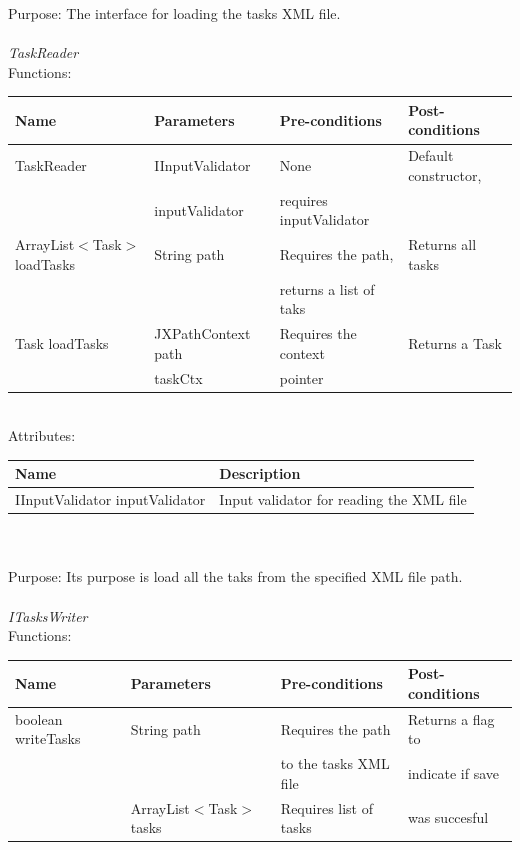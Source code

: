 Purpose: The interface for loading the tasks XML file.
\\
\\
\emph{TaskReader}\\
Functions:\\
\begin{tabular}{| l | l | l | l |}
\hline
Name & Parameters & Pre-conditions & Post-conditions\\
\hline
		TaskReader				& IInputValidator 	& None				& Default constructor, \\
							& inputValidator	&  requires inputValidator	& \\
		ArrayList$<$Task$>$loadTasks 	& String path       	& Requires the path,		& Returns all tasks\\
                                                                                    &                         	& returns a list of taks 	 &\\
		Task loadTasks 			& JXPathContext path & Requires the context	& Returns a Task \\
                                                                                    & taskCtx                & pointer			& 
\\
\hline
\end{tabular}
\\

Attributes:\\
\begin{tabular}{| l | l |}
\hline
 Name                                     	 	& Description\\
\hline
IInputValidator inputValidator		& Input validator for reading the XML file\\
\hline
\end{tabular}\\
\\

Purpose: Its purpose is load all the taks from the specified XML file path.
\\
\\

\emph{ITasksWriter}\\
Functions:\\
\begin{tabular}{| l | l | l | l |}
\hline
Name & Parameters & Pre-conditions & Post-conditions\\
\hline
		boolean writeTasks 	& String path       			& Requires the path 		& Returns a flag to\\
                                                           & 					& to the tasks XML file		& indicate if save \\
                                                           & ArrayList$<$Task$>$ tasks		& Requires list	of tasks	& was succesful
\\
\hline
\end{tabular}
\\

